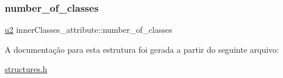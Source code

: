 \subsubsection{\texorpdfstring{number\+\_\+of\+\_\+classes}{number\_of\_classes}}
{\footnotesize\ttfamily \hyperlink{lista__operandos_8h_a732cde1300aafb73b0ea6c2558a7a54f}{u2} inner\+Classes\+\_\+attribute\+::number\+\_\+of\+\_\+classes}



A documentação para esta estrutura foi gerada a partir do seguinte arquivo\+:\begin{DoxyCompactItemize}
\item 
\hyperlink{structures_8h}{structures.\+h}\end{DoxyCompactItemize}
